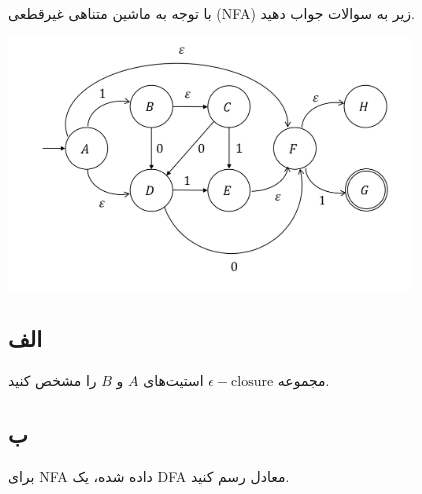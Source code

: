 با توجه به ماشین متناهی غیرقطعی
(NFA)
زیر به سوالات جواب دهید.

\begin{center}
    \includegraphics[width = 0.8\textwidth]{"commons/image1.png"}
\end{center}

\subsection*{الف}
مجموعه
$\epsilon - \text{closure}$
استیت‌های
$A$
و
$B$
را مشخص کنید.

\subsection*{ب}
برای
NFA
داده شده، یک
DFA
معادل رسم کنید.